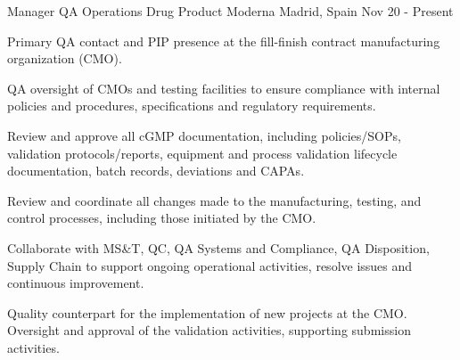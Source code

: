 

\begin{cventries}

\cventry
    {Manager QA Operations Drug Product} %
    {Moderna} %
    {Madrid, Spain} %
    {Nov 20 - Present} %
    {
        \begin{cvitems} %
            \item {Primary QA contact and PIP presence at the fill-finish contract manufacturing organization (CMO).}
            \item {QA oversight of CMOs and testing facilities to ensure compliance with internal policies and procedures, specifications and regulatory requirements.}
            \item {Review and approve all cGMP documentation, including policies/SOPs, validation protocols/reports, equipment and process validation lifecycle documentation, batch records, deviations and CAPAs.}
            \item {Review and coordinate all changes made to the manufacturing, testing, and control processes, including those initiated by the CMO.}
            \item {Collaborate with MS\&T, QC, QA Systems and Compliance, QA Disposition, Supply Chain to support ongoing operational activities, resolve issues and continuous improvement.}
            \item {Quality counterpart for the implementation of new projects at the CMO. Oversight and approval of the validation activities, supporting submission activities.}
        \end{cvitems}
    }


\end{cventries}
